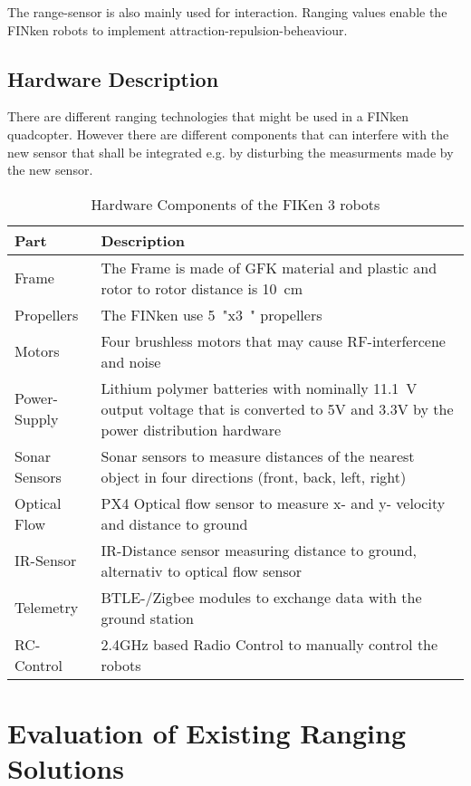 The range-sensor is also mainly used for interaction.
Ranging values enable the FINken robots to implement attraction-repulsion-beheaviour.

\subsection{Hardware Description}
There are different ranging technologies that might be used in a FINken quadcopter.
However there are different components that can interfere with the new sensor that shall be integrated e.g. by disturbing the measurments made by the new sensor.

\begin{table}[H]
	\begin{tabularx}{\columnwidth}{l | X}
	Part & Description \\ \hline
	Frame & The Frame is made of GFK material and plastic and rotor to rotor distance is \SI{10}{\centi\metre} \\
	Propellers & The FINken use \SI{5}{"}x\SI{3}{"} propellers \\
	Motors & Four brushless motors that may cause RF-interfercene and noise \\
	Power-Supply & Lithium polymer batteries with nominally \SI{11.1}{\volt} output voltage that is converted to 5V and 3.3V by the power distribution hardware \\
	Sonar Sensors & Sonar sensors to measure distances of the nearest object in four directions (front, back, left, right) \\
	Optical Flow & PX4 Optical flow sensor to measure x- and y- velocity and distance to ground \\
	IR-Sensor & IR-Distance sensor measuring distance to ground, alternativ to optical flow sensor \\
	Telemetry & BTLE-/Zigbee modules to exchange data with the ground station \\
	RC-Control &  2.4GHz based Radio Control to manually control the robots \\
	\end{tabularx}
	\caption{Hardware Components of the FIKen 3 robots}
\end{table}

\section{Evaluation of Existing Ranging Solutions}

